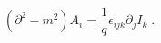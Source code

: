 \begin{equation}
(\partial ^{2}-m^{2})A_{i}=\frac{1}{q}\epsilon _{ijk}\partial _{j}I_{k}\;.
\label{bc}
\end{equation}

